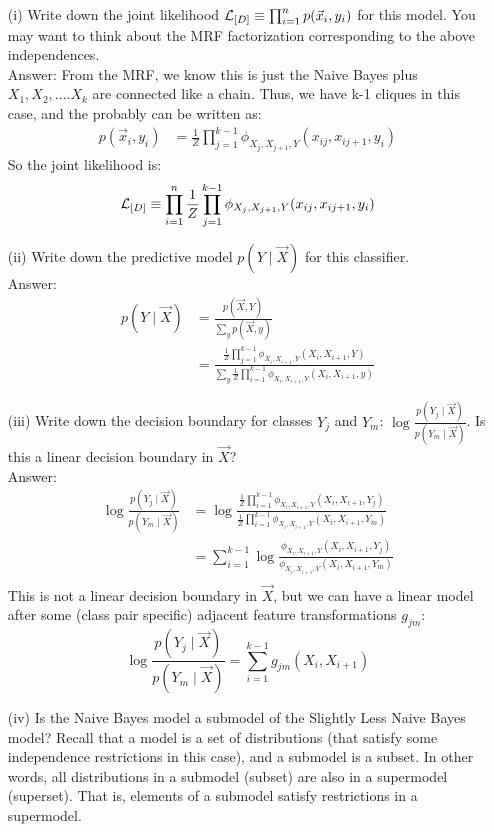 \documentclass[11pt]{article}
\begin{document}
\begin{itemize}
\item[(i)] Write down the joint likelihood ${\cal L}_{[D]} \equiv \prod_{i=1}^n p(\vec{x}_i, y_i)$ for this model.  You may want to think about the MRF factorization corresponding to the above independences.\\
Answer: From the MRF, we know this is just the Naive Bayes plus $X_1, X_2, .... X_k$ are connected like a chain. Thus, we have k-1 cliques in this case, and the probably can be written as:
\begin{align*}
p(\vec{x}_i, y_i) &=  \frac{1}{Z} \prod_{j=1}^{k-1} \phi_{X_j, X_{j+1}, Y}(x_{ij}, x_{ij+1}, y_i)
\end{align*}
So the joint likelihood is:
\begin{align*}
{\cal L}_{[D]} \equiv \prod_{i=1}^n  \frac{1}{Z} \prod_{j=1}^{k-1}\phi_{X_j, X_{j+1}, Y}(x_{ij}, x_{ij+1}, y_i)
\end{align*}
\item[(ii)] Write down the predictive model $p(Y \mid \vec{X})$ for this classifier.\\
Answer: \begin{align*}
p(Y \mid \vec{X})&= \frac {p(\vec{X}, Y)}{\sum_{y}p(\vec{X}, y)}\\
&= \frac{\frac{1}{Z} \prod_{j=1}^{k-1} \phi_{X_i, X_{i+1}, Y}(X_{i}, X_{i+1}, Y)}{\sum_{y}\frac{1}{Z} \prod_{i=1}^{k-1} \phi_{X_i, X_{i+1}, Y}(X_{i}, X_{i+1}, y)}
\end{align*} 

\item[(iii)] Write down the decision boundary for classes $Y_j$ and $Y_m$: $\log \frac{p(Y_j \mid \vec{X})}{p(Y_m \mid \vec{X})}$.  Is this a linear decision boundary in $\vec{X}$?\\
Answer: 
\begin{align*}
\log \frac{p(Y_j \mid \vec{X})}{p(Y_m \mid \vec{X})} &= \log \frac{\frac{1}{Z} \prod_{i=1}^{k-1} \phi_{X_i, X_{i+1}, Y}(X_{i}, X_{i+1}, Y_j)}{\frac{1}{Z} \prod_{i=1}^{k-1} \phi_{X_i, X_{i+1}, Y}(X_{i}, X_{i+1}, Y_m)} \\
&= \sum_{i=1}^{k-1}\log \frac{ \phi_{X_i, X_{i+1}, Y}(X_{i}, X_{i+1}, Y_j)}{ \phi_{X_i, X_{i+1}, Y}(X_{i}, X_{i+1}, Y_m)}\\
\end{align*} 
This is not a linear decision boundary in $\vec{X}$,
but we can have a linear model after some (class pair specific) adjacent feature transformations $g_{jm}$:
$$\log \frac{p(Y_j \mid \vec{X})}{p(Y_m \mid \vec{X})} =  \sum_{i=1}^{k-1}g_{jm}(X_i, X_{i+1})$$
\item[(iv)] Is the Naive Bayes model a submodel of the Slightly Less Naive Bayes model?  Recall that a model is a set of distributions (that satisfy some independence restrictions in this case), and a 
submodel is a subset.  In other words, all distributions in a submodel (subset) are also in a supermodel (superset).  That is, elements of a submodel satisfy restrictions in a supermodel.


\end{itemize}
\end{document}
